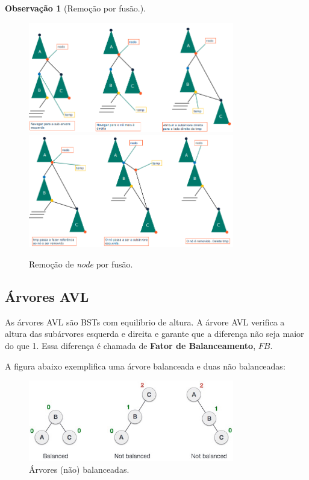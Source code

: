 \documentclass[a4paper, 12pt]{article}
\newtheorem{remark}{Observação}
\begin{document}
\begin{remark}[Remoção por fusão.]
\end{remark}
\begin{figure}[H]
    \centering
    \includegraphics[width=0.8\textwidth]{fig/t/bstRemoveFusion.png}
    \includegraphics[width=0.8\textwidth]{fig/t/bstRemoveFusion2.png}
    \caption{Remoção de \emph{node} por fusão.}
\end{figure}

\subsection{Árvores AVL}
As árvores AVL são BSTs com equilíbrio de altura. A árvore AVL verifica a altura das subárvores esquerda e direita e garante que a diferença não seja maior do que 1. Essa diferença é chamada de \textbf{Fator de Balanceamento}, $FB$.

A figura abaixo exemplifica uma árvore balanceada e duas não balanceadas:

\begin{figure}[H]
    \centering
    \includegraphics[width=0.8\textwidth]{fig/t/unbalanced_avl_trees.jpg}
    \caption{Árvores (não) balanceadas.}
\end{figure}
\end{document}
